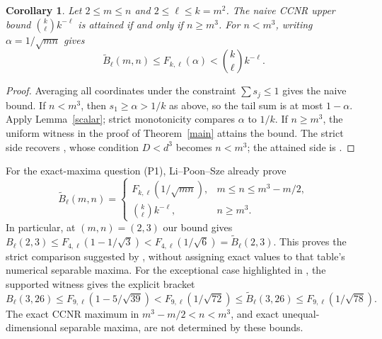\documentclass[11pt]{article}
\newtheorem{corollary}[theorem]{Corollary}
\newcommand{\F}{F_{k,\ell}}
\begin{document}
\begin{corollary}\label{naive}
Let $2\le m\le n$ and $2\le\ell\le k=m^2$. The naive CCNR upper
bound $\binom{k}{\ell}k^{-\ell}$ is attained if and only if $n\ge m^3$.
For $n<m^3$, writing $\alpha=1/\sqrt{mn}$ gives
\[
 \widetilde B_\ell(m,n)\le\F(\alpha)
 <\binom{k}{\ell}k^{-\ell}.
\]
\end{corollary}
\begin{proof}
Averaging all coordinates under the constraint $\sum s_j\le1$ gives
the naive bound. If $n<m^3$, then $s_1\ge\alpha>1/k$ as above,
so the tail sum is at most $1-\alpha$. Apply Lemma~\ref{scalar};
strict monotonicity compares $\alpha$ to $1/k$.
If $n\ge m^3$, the uniform witness in the proof of
Theorem~\ref{main} attains the bound.
The strict side recovers \cite[Proposition~4]{LAS}, whose condition
$D<d^3$ becomes $n<m^3$; the attained side is
\cite[Theorem~2.3]{LPS}.
\end{proof}

For the exact-maxima question (P1), Li--Poon--Sze already prove
\cite[Theorem~2.3]{LPS}
\begin{equation}\label{known-maxima}
 \widetilde B_\ell(m,n)=
 \begin{cases}
 \F(1/\sqrt{mn}),&m\le n\le m^3-m/2,\\
 \binom{k}{\ell}k^{-\ell},&n\ge m^3.
 \end{cases}
\end{equation}
In particular, at $(m,n)=(2,3)$ our bound gives
$B_\ell(2,3)\le F_{4,\ell}(1-1/\sqrt3)
<F_{4,\ell}(1/\sqrt6)=\widetilde B_\ell(2,3)$.
This proves the strict comparison suggested by \cite[Table~2]{LAS},
without assigning exact values to that table's numerical separable maxima.
For the exceptional case highlighted in \cite[p.~9]{LPS},
the supported witness gives the explicit bracket
\[
 B_\ell(3,26)\le F_{9,\ell}(1-5/\sqrt{39})
 <F_{9,\ell}(1/\sqrt{72})
 \le\widetilde B_\ell(3,26)\le F_{9,\ell}(1/\sqrt{78}).
\]
The exact CCNR maximum in $m^3-m/2<n<m^3$, and exact unequal-dimensional
separable maxima, are not determined by these bounds.
\end{document}
